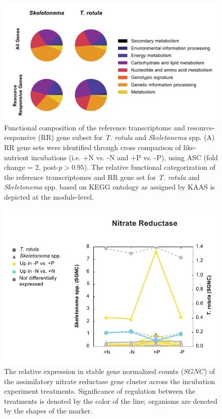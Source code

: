 \begin{figure}[p!]
  \centering
    \includegraphics[width=1\textwidth]{Images/C3_SFigure5_RR_All_Genes_Pie.pdf}
    \caption[Functional composition of the reference transcriptome and resource-responsive gene sets]{Functional composition of the reference transcriptome and resource-responsive (RR) gene subset for \textit{T. rotula} and \textit{Skeletonema} spp. (A) RR gene sets were identified through cross comparison of like-nutrient incubations (i.e. +N vs. -N and +P vs. -P), using ASC (fold change = 2, post-$p > 0.95$). The relative functional categorization of the reference transcriptomes and RR gene set for \textit{T. rotula} and \textit{Skeletonema} spp. based on KEGG ontology as assigned by KAAS is depicted at the module-level.}
  \label{fig:a3f5}
\end{figure}


\begin{figure}[p!]
  \centering
    \includegraphics[width=1\textwidth]{Images/C3_SFigure6_SGNC_NitrateReductase.pdf}
    \caption[Relative expression of nitrate reducatses across incubation experiments]{The relative expression in stable gene normalized counts ($SGNC$) of the assimilatory nitrate reductase gene cluster across the incubation experiment treatments. Significance of regulation between the treatments is denoted by the color of the line; organisms are denoted by the shapes of the marker.}
  \label{fig:a3f6}
\end{figure}

